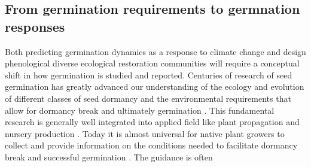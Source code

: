 \documentclass{article}\usepackage[]{graphicx}\usepackage[]{color}
\begin{document}
\subsection*{From germination requirements to germnation responses}
Both predicting germination dynamics as a response to climate change and design phenological diverse ecological restoration communities will require a conceptual shift in how germination is studied and reported. Centuries of research of seed germination has greatly advanced our understanding of the ecology and evolution of different classes of seed dormancy and the environmental requirements that allow for dormancy break and ultimately germination \citep{}. This fundamental research is generally well integrated into applied field like plant propagation and nursery production \citep{}. Today it is almost universal for native plant growers to collect and provide information on the conditions needed to facilitate dormancy break and successful germination \citep{}. The guidance is often 



\end{document}
